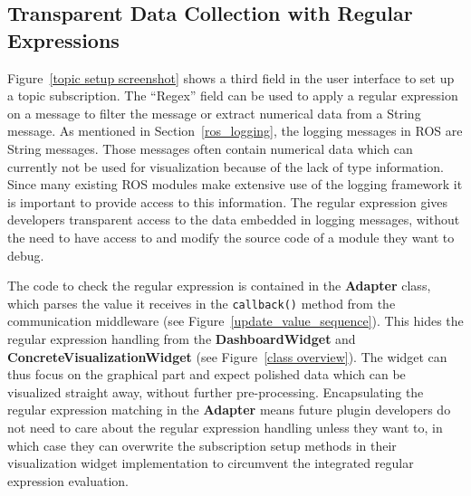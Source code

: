 \subsection{Transparent Data Collection with Regular Expressions}
\label{transparent_collection}

Figure~\ref{topic setup screenshot} shows a third field in the user interface to set up a topic subscription. The ``Regex'' field can be used to apply a regular expression on a message to filter the message or extract numerical data from a String message. As mentioned in Section~\ref{ros_logging}, the logging messages in ROS are String messages. Those messages often contain numerical data which can currently not be used for visualization because of the lack of type information. Since many existing ROS modules make extensive use of the logging framework it is important to provide access to this information. The regular expression gives developers transparent access to the data embedded in logging messages, without the need to have access to and modify the source code of a module they want to debug.

The code to check the regular expression is contained in the \textbf{Adapter} class, which parses the value it receives in the \verb+callback()+ method from the communication middleware (see Figure~\ref{update_value_sequence}). This hides the regular expression handling from the \textbf{DashboardWidget} and \textbf{ConcreteVisualizationWidget} (see Figure~\ref{class overview}). The widget can thus focus on the graphical part and expect polished data which can be visualized straight away, without further pre-processing. Encapsulating the regular expression matching in the \textbf{Adapter} means future plugin developers do not need to care about the regular expression handling unless they want to, in which case they can overwrite the subscription setup methods in their visualization widget implementation to circumvent the integrated regular expression evaluation.

